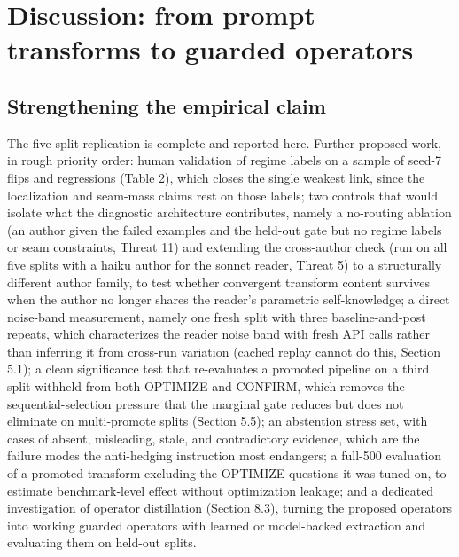 \section{Discussion: from prompt transforms to guarded operators}

\subsection{Strengthening the empirical claim}
The five-split replication is complete and reported here. Further proposed work, in rough priority order: human validation of regime labels on a sample of seed-7 flips and regressions (Table 2), which closes the single weakest link, since the localization and seam-mass claims rest on those labels; two controls that would isolate what the diagnostic architecture contributes, namely a no-routing ablation (an author given the failed examples and the held-out gate but no regime labels or seam constraints, Threat 11) and extending the cross-author check (run on all five splits with a haiku author for the sonnet reader, Threat 5) to a structurally different author family, to test whether convergent transform content survives when the author no longer shares the reader's parametric self-knowledge; a direct noise-band measurement, namely one fresh split with three baseline-and-post repeats, which characterizes the reader noise band with fresh API calls rather than inferring it from cross-run variation (cached replay cannot do this, Section 5.1); a clean significance test that re-evaluates a promoted pipeline on a third split withheld from both OPTIMIZE and CONFIRM, which removes the sequential-selection pressure that the marginal gate reduces but does not eliminate on multi-promote splits (Section 5.5); an abstention stress set, with cases of absent, misleading, stale, and contradictory evidence, which are the failure modes the anti-hedging instruction most endangers; a full-500 evaluation of a promoted transform excluding the OPTIMIZE questions it was tuned on, to estimate benchmark-level effect without optimization leakage; and a dedicated investigation of operator distillation (Section 8.3), turning the proposed operators into working guarded operators with learned or model-backed extraction and evaluating them on held-out splits.

